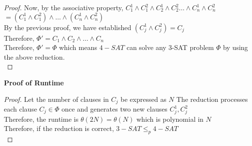 \begin{problem}
\begin{proof}
        Now, by the associative property,
        $C^1_1 \land C^2_1 \land C^1_2 \land C^2_2 \dots \land C^1_n \land C^2_n$
        $ = (C^1_1 \land C^2_1) \land \dots \land (C^1_n \land C^2_n)$ \\
        By the previous proof, we have established $(C^1_j \land C^2_j) = C_j$ \\
        Therefore, $\Phi' = C_1 \land C_2 \land \dots \land C_n$ \\
        Therefore, $\Phi' = \Phi$ which means $4-SAT$ can solve any 3-SAT problem $\Phi$ by using the above reduction. \\
    \end{proof}
    \noindent
    \textbf{Proof of Runtime}
    \begin{proof}
        Let the number of clauses in $C_j$ be expressed as $N$
        The reduction processes each clause $C_j \in \Phi$ once and generates two new clauses $C^1_j, C^2_j$ \\
        Therefore, the runtime is $\theta(2N) = \theta(N)$ which is polynomial in $N$ \\
        Therefore, if the reduction is correct, $3-SAT \leq_{p} 4-SAT$ \\
    \end{proof}
\end{problem}
